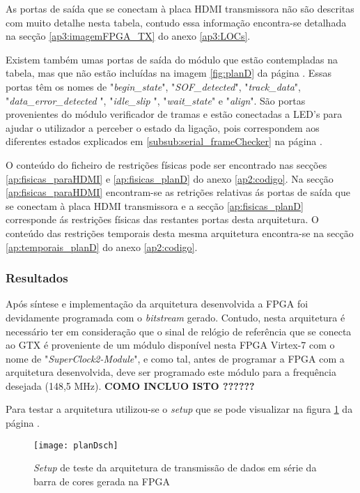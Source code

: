 As portas de saída que se conectam à placa HDMI transmissora não são descritas com muito detalhe nesta tabela, contudo essa informação encontra-se detalhada na secção \ref{ap3:imagemFPGA_TX} do anexo \ref{ap3:LOCs}.

Existem também umas portas de saída do módulo que estão contempladas na tabela, mas que não estão incluídas na imagem \ref{fig:planD} da página \pageref{fig:planD}. Essas portas têm os nomes de "\textit{begin\_state}", "\textit{SOF\_detected}", "\textit{track\_data}", "\textit{data\_error\_detected }", "\textit{idle\_slip }", "\textit{wait\_state}" e "\textit{align}". São portas provenientes do módulo verificador de tramas e estão conectadas a LED's para ajudar o utilizador a perceber o estado da ligação, pois correspondem aos diferentes estados explicados em \ref{subsub:serial_frameChecker} na página \pageref{subsub:serial_frameChecker}.


O conteúdo do ficheiro de restrições físicas pode ser encontrado nas secções \ref{ap:fisicas_paraHDMI} e \ref{ap:fisicas_planD} do anexo \ref{ap2:codigo}. Na secção \ref{ap:fisicas_paraHDMI}  encontram-se as retrições relativas ás portas de saída que se conectam à placa HDMI transmissora e a secção \ref{ap:fisicas_planD} corresponde ás restrições físicas das restantes portas desta arquitetura. O conteúdo das restrições temporais desta mesma arquitetura encontra-se na secção \ref{ap:temporais_planD} do anexo \ref{ap2:codigo}.
%
%
\subsubsection{Resultados} \label{subsub:serial_planDresults}

Após síntese e  implementação da arquitetura desenvolvida a FPGA foi devidamente programada com o \textit{bitstream} gerado. Contudo, nesta arquitetura é necessário ter em consideração que o sinal de relógio de referência que se conecta ao GTX é proveniente de um módulo disponível nesta FPGA Virtex-7 com o nome de "\textit{SuperClock2-Module}", e como tal, antes de programar a FPGA com a arquitetura desenvolvida, deve ser programado este módulo para a frequência desejada (148,5 MHz). \textbf{COMO INCLUO ISTO ??????}

Para testar a arquitetura utilizou-se o \textit{setup} que se pode visualizar na figura \ref{fig:planD_setup} da página \pageref{fig:planD_setup}.
\begin{figure}[h!]
	\begin{center}
		\leavevmode
		\texttt{[image: planDsch]}
		\captionsetup{width=1.0\linewidth}
		\caption[\textit{Setup} de teste da arquitetura]{\textit{Setup} de teste da arquitetura de transmissão de dados em série da barra de cores gerada na FPGA}
		\label{fig:planD_setup}
	\end{center}
\end{figure}

